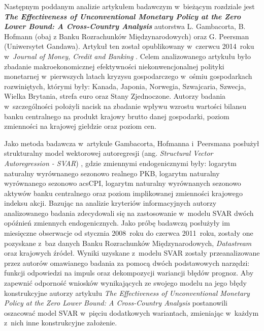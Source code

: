Następnym poddanym analizie artykułem badawczym w~bieżącym rozdziale jest \textbf{\textit{The Effectiveness of Unconventional Monetary Policy at the Zero Lower Bound: A Cross-Country Analysis}} autorstwa L. Gambacorta, B. Hofmann (obaj z Banku Rozrachunków Międzynarodowych) oraz G. Peersman (Uniwersytet Gandawa). Artykuł ten został opublikowany w~czerwcu 2014~roku w~\textit{Journal of Money, Credit and Banking} \cite{gambacorta35}. Celem analizowanego artykułu było zbadanie makroekonomicznej efektywności niekonwencjonalnej polityki monetarnej w~pierwszych latach kryzysu gospodarczego w~ośmiu gospodarkach rozwiniętych, którymi były: Kanada, Japonia, Norwegia, Szwajcaria, Szwecja, Wielka Brytania, strefa euro oraz Stany Zjednoczone. Autorzy badania w~szczególności położyli nacisk na zbadanie wpływu wzrostu wartości bilansu banku centralnego na produkt krajowy brutto danej gospodarki, poziom zmienności na krajowej giełdzie oraz poziom cen. 

Jako metoda badawcza w~artykule Gambacorta, Hofmanna i~Peersmana posłużył strukturalny model wektorowej autoregresji (ang. \textit{Structural Vector Autoregression - SVAR}) , gdzie zmiennymi endogenicznymi były: logarytm naturalny wyrównanego sezonowo realnego PKB, logarytm naturalny wyrównanego sezonowo acs{CPI}, logarytm naturalny wyrównanych sezonowo aktywów banku centralnego oraz poziom implikowanej zmienności krajowego indeksu akcji. Bazując na analizie kryteriów informacyjnych autorzy analizowanego badania zdecydowali się na zastosowanie w~modelu \acs{SVAR} dwóch opóźnień zmiennych endogenicznych. Jako próbę badawczą posłużyły im miesięczne obserwacje od stycznia 2008~roku do czerwca 2011~roku, zostały one pozyskane z~baz danych Banku Rozrachunków Międzynarodowych, \textit{Datastream} oraz krajowych źródeł. Wyniki uzyskane z~modelu \acs{SVAR} zostały przeanalizowane przez autorów omawianego badania za pomocą dwóch podstawowych narzędzi: funkcji odpowiedzi na impuls oraz dekompozycji wariancji błędów prognoz. Aby zapewnić odporność wniosków wynikających ze swojego modelu na jego błędy konstrukcyjne autorzy artykułu \textit{The Effectiveness of Unconventional Monetary Policy at the Zero Lower Bound: A Cross-Country Analysis} postanowili oszacować model \acs{SVAR} w~pięciu dodatkowych wariantach, zmieniając w~każdym z~nich inne konstrukcyjne założenie.

